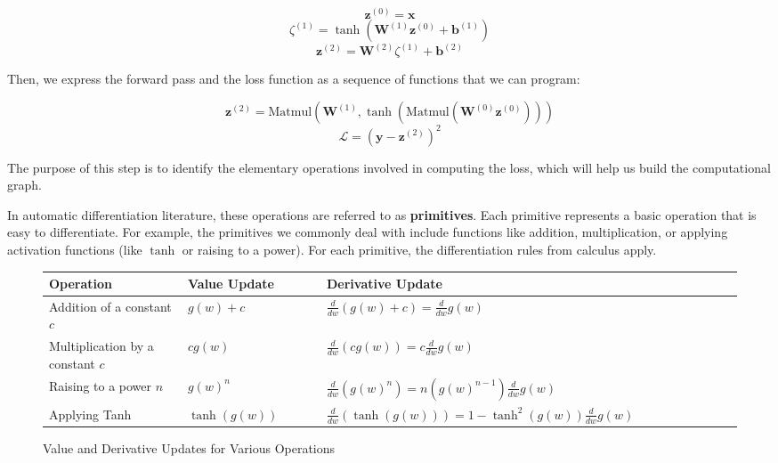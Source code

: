 \[
    \bm{z}^{(0)} = \bm{x}
\]
\[
    \zeta^{(1)} = \tanh\left( \bm{W}^{(1)} \bm{z}^{(0)} + \bm{b}^{(1)} \right)
\]
\[
    \bm{z}^{(2)} = \bm{W}^{(2)} \zeta^{(1)} + \bm{b}^{(2)}
\]


Then, we express the forward pass and the loss function as a sequence of functions that we can program:

\begin{equation}
    \bm{z}^{(2)} = \text{Matmul}\left( \bm{W}^{(1)}, \tanh\left( \text{Matmul} \left( \bm{W}^{(0)} \bm{z}^{(0)} \right) \right) \right)
\end{equation}
\begin{equation}
    \mathcal{L} = \left( \bm{y} - \bm{z}^{(2)} \right)^2
\end{equation}

The purpose of this step is to identify the elementary operations involved in computing the loss, which will help us build the computational graph. \bigskip

In automatic differentiation literature, these operations are referred to as \textbf{primitives}. Each primitive represents a basic operation that is easy to differentiate. For example, the primitives we commonly deal with include functions like addition, multiplication, or applying activation functions (like \( \tanh \) or raising to a power). For each primitive, the differentiation rules from calculus apply.


\begin{figure}[ht]
    \centering
    \begin{tabularx}{\linewidth}{p{0.2\linewidth} p{0.2\linewidth} p{0.6\linewidth}}
        \toprule
        \textbf{Operation}               & \textbf{Value Update} & \textbf{Derivative Update}                                       \\
        \midrule
        Addition of a constant $c$       & $g(w) + c$            & $\frac{d}{dw}(g(w) + c) = \frac{d}{dw}g(w)$                      \\
        \hline
        Multiplication by a constant $c$ & $cg(w)$               & $\frac{d}{dw}(cg(w)) = c \frac{d}{dw}g(w)$                       \\
        \hline
        Raising to a power $n$           & $g(w)^n$              & $\frac{d}{dw}(g(w)^n) = n(g(w)^{n-1})\frac{d}{dw}g(w)$           \\
        \hline
        Applying Tanh                    & $\tanh(g(w))$         & $\frac{d}{dw}(\tanh(g(w))) = 1 - \tanh^2(g(w)) \frac{d}{dw}g(w)$ \\
        \bottomrule
    \end{tabularx}
    \caption{Value and Derivative Updates for Various Operations}
\end{figure}

